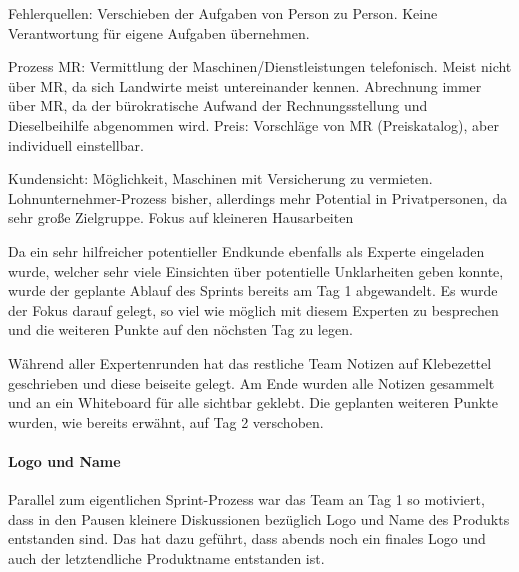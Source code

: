 Fehlerquellen:
Verschieben der Aufgaben von Person zu Person. Keine Verantwortung für eigene Aufgaben übernehmen.

Prozess MR:
Vermittlung der Maschinen/Dienstleistungen telefonisch. Meist nicht über MR, da sich Landwirte meist untereinander kennen. Abrechnung immer über MR, da der bürokratische Aufwand der Rechnungsstellung und Dieselbeihilfe abgenommen wird. Preis: Vorschläge von MR (Preiskatalog), aber individuell einstellbar.

Kundensicht: Möglichkeit, Maschinen mit Versicherung zu vermieten. Lohnunternehmer-Prozess bisher, allerdings mehr Potential in Privatpersonen, da sehr große Zielgruppe. Fokus auf kleineren Hausarbeiten

Da ein sehr hilfreicher potentieller Endkunde ebenfalls als Experte eingeladen wurde, welcher sehr viele Einsichten über potentielle Unklarheiten geben konnte, wurde der geplante Ablauf des Sprints bereits am Tag 1 abgewandelt. Es wurde der Fokus darauf gelegt, so viel wie möglich mit diesem Experten zu besprechen und die weiteren Punkte auf den nöchsten Tag zu legen.

Während aller Expertenrunden hat das restliche Team Notizen auf Klebezettel geschrieben und diese beiseite gelegt. Am Ende wurden alle Notizen gesammelt und an ein Whiteboard für alle sichtbar geklebt. Die geplanten weiteren Punkte wurden, wie bereits erwähnt, auf Tag 2 verschoben.

\paragraph{Logo und Name}
Parallel zum eigentlichen Sprint-Prozess war das Team an Tag 1 so motiviert, dass in den Pausen kleinere Diskussionen bezüglich Logo und Name des Produkts entstanden sind. Das hat dazu geführt, dass abends noch ein finales Logo und auch der letztendliche Produktname entstanden ist. 


